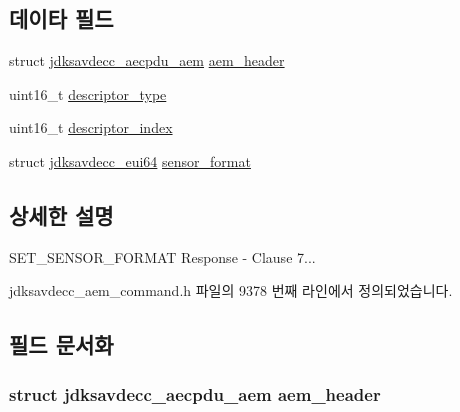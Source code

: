 \subsection*{데이타 필드}
\begin{DoxyCompactItemize}
\item 
struct \hyperlink{structjdksavdecc__aecpdu__aem}{jdksavdecc\+\_\+aecpdu\+\_\+aem} \hyperlink{structjdksavdecc__aem__command__set__sensor__format__response_ae1e77ccb75ff5021ad923221eab38294}{aem\+\_\+header}
\item 
uint16\+\_\+t \hyperlink{structjdksavdecc__aem__command__set__sensor__format__response_ab7c32b6c7131c13d4ea3b7ee2f09b78d}{descriptor\+\_\+type}
\item 
uint16\+\_\+t \hyperlink{structjdksavdecc__aem__command__set__sensor__format__response_a042bbc76d835b82d27c1932431ee38d4}{descriptor\+\_\+index}
\item 
struct \hyperlink{structjdksavdecc__eui64}{jdksavdecc\+\_\+eui64} \hyperlink{structjdksavdecc__aem__command__set__sensor__format__response_a100aa7be90c95e113ca53584ab78094a}{sensor\+\_\+format}
\end{DoxyCompactItemize}


\subsection{상세한 설명}
S\+E\+T\+\_\+\+S\+E\+N\+S\+O\+R\+\_\+\+F\+O\+R\+M\+AT Response -\/ Clause 7... 

jdksavdecc\+\_\+aem\+\_\+command.\+h 파일의 9378 번째 라인에서 정의되었습니다.



\subsection{필드 문서화}
\subsubsection[{\texorpdfstring{aem\+\_\+header}{aem_header}}]{\setlength{\rightskip}{0pt plus 5cm}struct {\bf jdksavdecc\+\_\+aecpdu\+\_\+aem} aem\+\_\+header}\hypertarget{structjdksavdecc__aem__command__set__sensor__format__response_ae1e77ccb75ff5021ad923221eab38294}{}\label{structjdksavdecc__aem__command__set__sensor__format__response_ae1e77ccb75ff5021ad923221eab38294}


